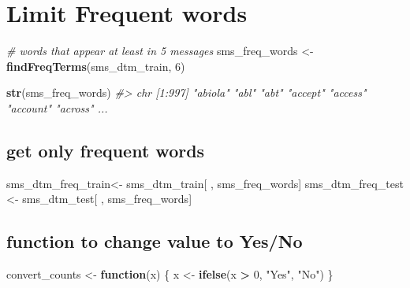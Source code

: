 \documentclass[]{book}
\newenvironment{Shaded}{\begin{snugshade}}{\end{snugshade}}
\newcommand{\CommentTok}[1]{\textcolor[rgb]{0.56,0.35,0.01}{\textit{#1}}}
\newcommand{\ControlFlowTok}[1]{\textcolor[rgb]{0.13,0.29,0.53}{\textbf{#1}}}
\newcommand{\DecValTok}[1]{\textcolor[rgb]{0.00,0.00,0.81}{#1}}
\newcommand{\KeywordTok}[1]{\textcolor[rgb]{0.13,0.29,0.53}{\textbf{#1}}}
\newcommand{\NormalTok}[1]{#1}
\newcommand{\OperatorTok}[1]{\textcolor[rgb]{0.81,0.36,0.00}{\textbf{#1}}}
\newcommand{\StringTok}[1]{\textcolor[rgb]{0.31,0.60,0.02}{#1}}
\begin{document}
\hypertarget{limit-frequent-words}{%
\section{Limit Frequent words}\label{limit-frequent-words}}

\begin{Shaded}
\begin{Highlighting}[]
\CommentTok{# words that appear at least in 5 messages}
\NormalTok{sms_freq_words <-}\StringTok{ }\KeywordTok{findFreqTerms}\NormalTok{(sms_dtm_train, }\DecValTok{6}\NormalTok{)}
\end{Highlighting}
\end{Shaded}

\begin{Shaded}
\begin{Highlighting}[]
\KeywordTok{str}\NormalTok{(sms_freq_words)}
\CommentTok{#>  chr [1:997] "abiola" "abl" "abt" "accept" "access" "account" "across" ...}
\end{Highlighting}
\end{Shaded}

\hypertarget{get-only-frequent-words}{%
\subsection{get only frequent words}\label{get-only-frequent-words}}

\begin{Shaded}
\begin{Highlighting}[]
\NormalTok{sms_dtm_freq_train<-}\StringTok{ }\NormalTok{sms_dtm_train[ , sms_freq_words]}
\NormalTok{sms_dtm_freq_test <-}\StringTok{ }\NormalTok{sms_dtm_test[ , sms_freq_words]}
\end{Highlighting}
\end{Shaded}

\hypertarget{function-to-change-value-to-yesno}{%
\subsection{function to change value to Yes/No}\label{function-to-change-value-to-yesno}}

\begin{Shaded}
\begin{Highlighting}[]
\NormalTok{convert_counts <-}\StringTok{ }\ControlFlowTok{function}\NormalTok{(x) \{}
\NormalTok{    x <-}\StringTok{ }\KeywordTok{ifelse}\NormalTok{(x }\OperatorTok{>}\StringTok{ }\DecValTok{0}\NormalTok{, }\StringTok{"Yes"}\NormalTok{, }\StringTok{"No"}\NormalTok{)}
\NormalTok{  \}}
\end{Highlighting}
\end{Shaded}
\end{document}
